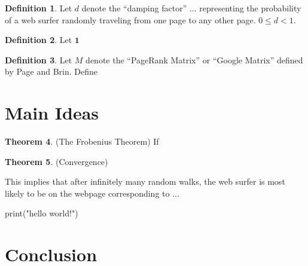 \documentclass[11pt]{article}
\theoremstyle{definition}
\newtheorem{theorem}{Theorem}
\newtheorem{definition}[theorem]{Definition}
\renewcommand{\vec}[1]{\mathbf{#1}}
\begin{document}
\begin{definition}
    Let $d$ denote the ``damping factor'' ... representing the probability of a web surfer randomly traveling from one page to any other page. $0 \leq d < 1$.
\end{definition}

\begin{definition}
    Let $\vec{1}$ 
\end{definition}

\begin{definition}
    Let $M$ denote the ``PageRank Matrix'' or ``Google Matrix'' defined by Page and Brin.
    Define 
\end{definition}


\section{Main Ideas}

\begin{theorem}
    (The Frobenius Theorem) If 
\end{theorem}

\begin{theorem}
    (Convergence) 
\end{theorem}

This implies that after infinitely many random walks, the web surfer is most likely to be on the webpage corresponding to ...

\begin{listing}[python]
    print("hello world!")
\end{listing}


\section{Conclusion}

\begin{thebibliography}{9}
\bibitem{}

\end{thebibliography}
\end{document}
